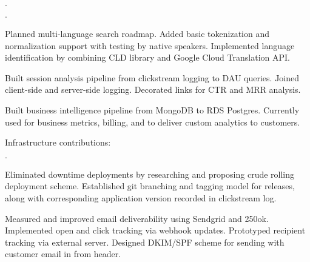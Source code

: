 \documentclass[11pt]{article}
\newenvironment{achievements}{\begin{list}{\bf \Large $\cdot$}{\topsep 2pt \itemsep 0pt}}{\vspace*{3pt}\end{list}}
\newenvironment{achievements2}{\begin{list}{\bf \Large $\cdot$}{\topsep 2pt \itemsep 0pt \leftmargin 12pt }}{\vspace*{3pt}\end{list}}
\begin{document}
\begin{achievements}
\begin{achievements2}
    \item Planned multi-language search roadmap.  Added basic tokenization and
      normalization support with testing by native speakers.  Implemented
      language identification by combining CLD library and Google Cloud
      Translation API.


    \item Built session analysis pipeline from clickstream logging to DAU
      queries.  Joined client-side and server-side logging.  Decorated links
      for CTR and MRR analysis.

    \item Built business intelligence pipeline from MongoDB to RDS Postgres.
      Currently used for business metrics, billing, and to deliver custom
      analytics to customers.

    \end{achievements2}


  \item[] Infrastructure contributions:
    \begin{achievements2}

    \item Eliminated downtime deployments by researching and proposing crude
      rolling deployment scheme.  Established git branching and tagging model
      for releases, along with corresponding application version recorded in
      clickstream log.

    \item Measured and improved email deliverability using Sendgrid and 250ok.
      Implemented open and click tracking via webhook updates.  Prototyped
      recipient tracking via external server.  Designed DKIM/SPF scheme for
      sending with customer email in from header.


\end{achievements2}
\end{achievements}
\end{document}
